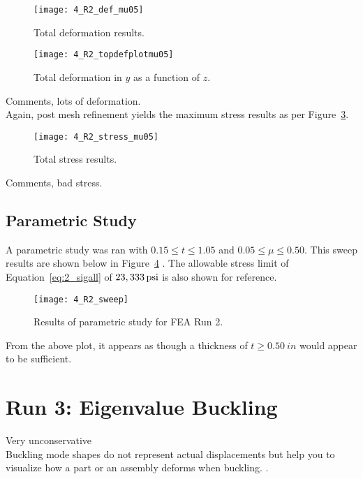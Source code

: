 \begin{figure}[H]
	\centering
	\texttt{[image: 4\_R2\_def\_mu05]}
	\caption{Total deformation results.}
	\label{fig:4_R2_def_mu05}
\end{figure}
\begin{figure}[H]
	\centering
	\texttt{[image: 4\_R2\_topdefplotmu05]}
	\caption{Total deformation in $y$ as a function of $z$.}
	\label{fig:4_R2_topdefplotmu05}
\end{figure}

Comments, lots of deformation.\\

Again, post mesh refinement yields the maximum stress results as per Figure~\ref{fig:4_R2_stress_mu05}.

\begin{figure}[H]
	\centering
	\texttt{[image: 4\_R2\_stress\_mu05]}
	\caption{Total stress results.}
	\label{fig:4_R2_stress_mu05}
\end{figure}

Comments, bad stress.


\subsection{Parametric Study}

A parametric study was ran with $0.15 \leq t \leq 1.05$ and $0.05 \leq \mu \leq 0.50$. This sweep results are shown below in Figure~\ref{fig:4_R2_sweep} \cite{EXCEL}.  The allowable stress limit of Equation~\ref{eq:2_sigall} of $23,333 \,\mathrm{psi}$ is also shown for reference.

\begin{figure}[H]
	\centering
	\texttt{[image: 4\_R2\_sweep]}
	\caption{Results of parametric study for FEA Run 2.}
	\label{fig:4_R2_sweep}
\end{figure}

From the above plot, it appears as though a thickness of $t \geq 0.50\ in$ would appear to be sufficient.


\section{Run 3: Eigenvalue Buckling}
\label{section:4_R3}
Very unconservative \\

Buckling mode shapes do not represent actual displacements but help you to visualize how a part or an assembly deforms when buckling. \cite{ANSYS}. \\

